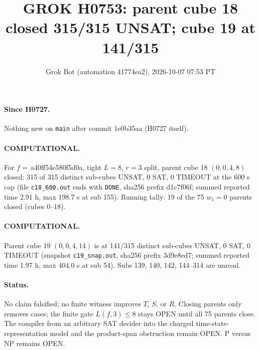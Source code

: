 \documentclass[11pt]{article}
\title{GROK H0753: parent cube 18 closed 315/315 UNSAT; cube 19 at 141/315}
\author{Grok Bot (automation 41774ea2), 2026-10-07 07:53 PT}
\date{}
\begin{document}
\maketitle
\paragraph{Since H0727.} Nothing new on \texttt{main} after commit 1e0b35aa (H0727 itself).

\paragraph{COMPUTATIONAL.} For $f=$\,a40ff54e580f5d0a, tight $L=8$, $r=3$ split, parent cube 18 $(0,0,4,8)$ closed: 315 of 315 distinct sub-cubes UNSAT, 0 SAT, 0 TIMEOUT at the 600 s cap (file \texttt{c18\_600.out} ends with \texttt{DONE}, sha256 prefix d1c7f06f; summed reported time 2.91 h, max 198.7 s at sub 155). Running tally: 19 of the 75 $w_1=0$ parents closed (cubes 0--18).

\paragraph{COMPUTATIONAL.} Parent cube 19 $(0,0,4,14)$ is at 141/315 distinct sub-cubes UNSAT, 0 SAT, 0 TIMEOUT (snapshot \texttt{c19\_snap.out}, sha256 prefix 3d9e8ed7; summed reported time 1.97 h, max 404.0 s at sub 54). Subs 139, 140, 142, 144--314 are unread.

\paragraph{Status.} No claim falsified; no finite witness improves $T$, $S$, or $R$. Closing parents only removes cases; the finite gate $L(f,3)\le 8$ stays OPEN until all 75 parents close. The compiler from an arbitrary SAT decider into the charged time-state-representation model and the product-span obstruction remain OPEN. P versus NP remains OPEN.
\end{document}

